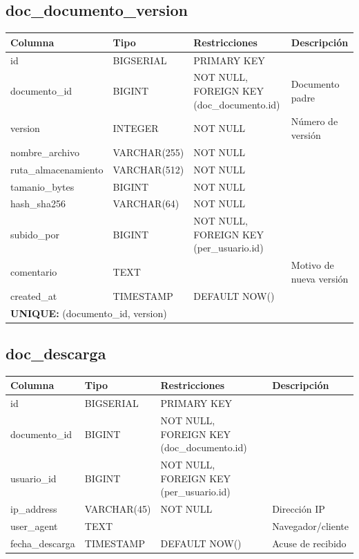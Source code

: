 \documentclass[12pt, a4paper]{article}
\begin{document}
\subsection{doc\_documento\_version}
\begin{longtable}{|p{3.5cm}|p{2.5cm}|p{3cm}|p{5cm}|}
    \hline
    \rowcolor[gray]{0.9}
    \textbf{Columna} & \textbf{Tipo} & \textbf{Restricciones} & \textbf{Descripción} \\
    \hline
    id & BIGSERIAL & PRIMARY KEY & \\
    \hline
    documento\_id & BIGINT & NOT NULL, FOREIGN KEY (doc\_documento.id) & Documento padre \\
    \hline
    version & INTEGER & NOT NULL & Número de versión \\
    \hline
    nombre\_archivo & VARCHAR(255) & NOT NULL & \\
    \hline
    ruta\_almacenamiento & VARCHAR(512) & NOT NULL & \\
    \hline
    tamanio\_bytes & BIGINT & NOT NULL & \\
    \hline
    hash\_sha256 & VARCHAR(64) & NOT NULL & \\
    \hline
    subido\_por & BIGINT & NOT NULL, FOREIGN KEY (per\_usuario.id) & \\
    \hline
    comentario & TEXT & & Motivo de nueva versión \\
    \hline
    created\_at & TIMESTAMP & DEFAULT NOW() & \\
    \hline
    \multicolumn{4}{|p{14cm}|}{\cellcolor[gray]{0.95} \textbf{UNIQUE:} (documento\_id, version)} \\
    \hline
\end{longtable}

\subsection{doc\_descarga}
\begin{longtable}{|p{3.5cm}|p{2.5cm}|p{3cm}|p{5cm}|}
    \hline
    \rowcolor[gray]{0.9}
    \textbf{Columna} & \textbf{Tipo} & \textbf{Restricciones} & \textbf{Descripción} \\
    \hline
    id & BIGSERIAL & PRIMARY KEY & \\
    \hline
    documento\_id & BIGINT & NOT NULL, FOREIGN KEY (doc\_documento.id) & \\
    \hline
    usuario\_id & BIGINT & NOT NULL, FOREIGN KEY (per\_usuario.id) & \\
    \hline
    ip\_address & VARCHAR(45) & NOT NULL & Dirección IP \\
    \hline
    user\_agent & TEXT & & Navegador/cliente \\
    \hline
    fecha\_descarga & TIMESTAMP & DEFAULT NOW() & Acuse de recibido \\
    \hline
\end{longtable}
\end{document}
